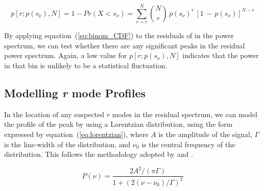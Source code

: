 \begin{equation}
p[r; p(s_\nu), N] = 1 - Pr(X < s_{\nu}) = \sum_{r=r}^{N} \binom{N}{r} \, p(s_{\nu})^r \, [1 \, - \, p(s_{\nu})]^{N-r}
\label{eq:binom_CDF}
\end{equation}

By applying equation~(\ref{eq:binom_CDF}) to the residuals of in the power spectrum, we can test whether there are any significant peaks in the residual power spectrum. Again, a low value for $p[r; p(s_\nu), N]$ indicates that the power in that bin is unlikely to be a statistical fluctuation.


%
%



\subsection{Modelling {\it r} mode Profiles}
In the location of any suspected $r$ modes in the residual spectrum, we can model the profile of the peak by using a Lorentzian distribution, using the form expressed by equation~(\ref{eq:lorentzian}), where $A$ is the amplitude of the signal, $\Gamma$ is the line-width of the distribution, and $\nu_0$ is the central frequency of the distribution. This follows the methodology adopted by \citet{loptien_global-scale_2018} and \citet{liang_time-distance_2019}.

\begin{equation}
P(\nu) = \frac{2A^2/(\pi \Gamma)}{1 + (2(\nu - \nu_0)/\Gamma)^2}
\label{eq:lorentzian}
\end{equation}

